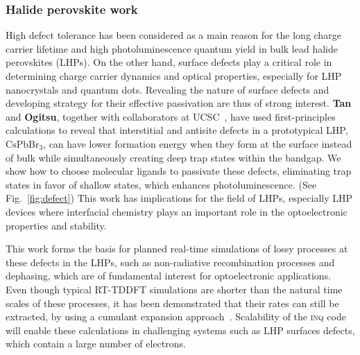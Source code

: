 \subsubsection{Halide perovskite work}

High defect tolerance has been considered as a main reason for the long charge carrier lifetime and high photoluminescence quantum yield in bulk lead halide perovskites (LHPs). 
On the other hand, surface defects play a critical role in determining charge carrier dynamics and optical properties, especially for LHP nanocrystals and quantum dots. Revealing the nature of surface defects and developing strategy for their effective passivation are thus of strong interest. 
{\bf Tan} and {\bf Ogitsu}, together with collaborators at UCSC~\cite{Smart2021}, have used first-principles calculations to reveal that interstitial and antisite defects in a prototypical LHP, \(\mathrm{CsPbBr_3}\), can have lower formation energy when they form at the surface instead of bulk while simultaneously creating deep trap states within the bandgap.
We show how to choose molecular ligands to passivate these defects, eliminating trap states in favor of shallow states, which enhances photoluminescence. 
(See Fig.~\ref{fig:defect}) This work has implications for  the field of LHPs, especially LHP devices where interfacial chemistry plays an important role in the optoelectronic properties and stability.

This work forms the basis for planned real-time simulations of lossy processes at these defects in the LHPs, such as non-radiative recombination processes and dephasing, which are of fundamental interest for optoelectronic applications. 
Even though typical RT-TDDFT simulations are shorter than the natural time scales of these processes, it has been demonstrated that their rates can still be extracted, by using a cumulant expansion approach~\cite{Qiao2020}. 
Scalability of the \textsc{inq} code will enable these calculations in challenging systems such as LHP surfaces defects, which contain a large number of electrons.     

